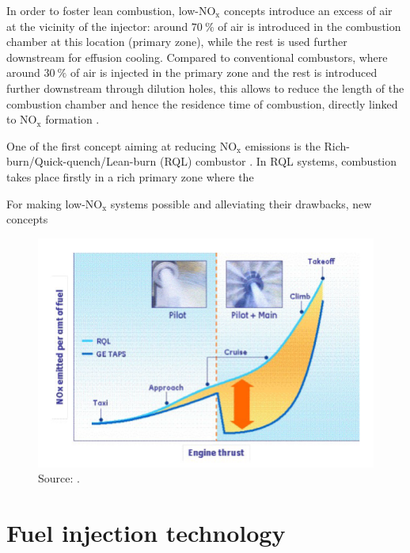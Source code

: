 In order to foster lean combustion, low-NO$_\mathrm{x}$ concepts introduce an excess of air at the vicinity of the injector: around $70 ~\%$ of air is introduced in the combustion chamber at this location (primary zone), while the rest is used further downstream for effusion cooling. Compared to conventional combustors, where around $30 ~\%$ of air is injected in the primary zone and the rest is introduced further downstream through dilution holes, this allows to reduce the length of the combustion chamber and hence the residence time of combustion, directly linked to NO$_\mathrm{x}$ formation . 

One of the first concept aiming at reducing NO$_\mathrm{x}$ emissions is the Rich-burn/Quick-quench/Lean-burn (RQL) combustor . In RQL systems, combustion takes place firstly in a rich primary zone where the

For making low-NO$_\mathrm{x}$ systems possible and alleviating their drawbacks, new concepts 

\begin{figure}[h!]
	\centering
	\includegraphics[scale=0.7]{./part0_intro/foust_RQL_vs_TAPS}
	\caption{Source: .}
	\label{fig:foust_RQL_vs_TAPS}
\end{figure}







\section{Fuel injection technology}

